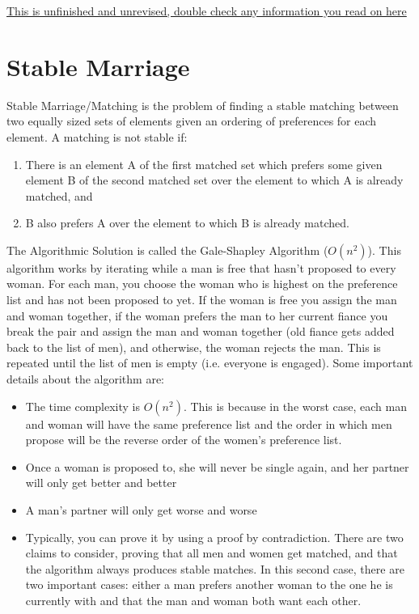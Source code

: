 \documentclass{article}
\begin{document}
\underline{This is unfinished and unrevised, double check any information you read on here}
\section{Stable Marriage}
Stable Marriage/Matching is the problem of finding a stable matching between two equally sized sets of elements given an ordering of preferences for each element.  
A matching is not stable if: 

\begin{enumerate}
    \item There is an element A of the first matched set which prefers some given element B of the second matched set over the element to which A is already matched, and
    \item B also prefers A over the element to which B is already matched.
\end{enumerate}

The Algorithmic Solution is called the Gale-Shapley Algorithm ($O(n^2)$). This algorithm works by
iterating while a man is free that hasn't proposed to every woman. For each man, you choose the
woman who is highest on the preference list and has not been proposed to yet. If the woman is free
you assign the man and woman together, if the woman prefers the man to her current fiance you break
the pair and assign the man and woman together (old fiance gets added back to the list of men), and otherwise, the woman rejects the man. 
This is repeated until the list of men is empty (i.e. everyone is engaged). Some important details about the algorithm are:

\begin{itemize}
    \item The time complexity is $O(n^2)$. This is because in the worst case, each man and woman will have the same preference list and the order in which men propose will be the reverse order of the women's preference list.
    \item Once a woman is proposed to, she will never be single again, and her partner will only get better and better
    \item A man's partner will only get worse and worse
    \item Typically, you can prove it by using a proof by contradiction. There are two claims to
      consider, proving that all men and women get matched, and that the algorithm always produces
      stable matches. In this second case, there are two important cases: either a man prefers
      another woman to the one he is currently with and that the man and woman both want each other.
\end{itemize}
\end{document}
